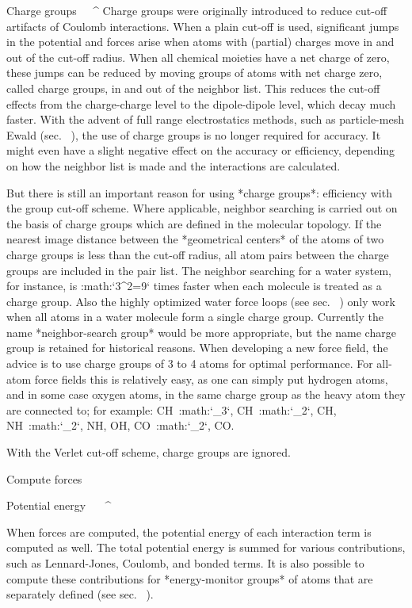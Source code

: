 Charge groups
^^^^^^^^^^^^^
Charge
groups were originally introduced to reduce cut-off artifacts of Coulomb
interactions. When a plain cut-off is used, significant jumps in the
potential and forces arise when atoms with (partial) charges move in and
out of the cut-off radius. When all chemical moieties have a net charge
of zero, these jumps can be reduced by moving groups of atoms with net
charge zero, called charge groups, in and out of the neighbor list. This
reduces the cut-off effects from the charge-charge level to the
dipole-dipole level, which decay much faster. With the advent of full
range electrostatics methods, such as particle-mesh Ewald
(sec. 
), the use of charge groups is no longer
required for accuracy. It might even have a slight negative effect on
the accuracy or efficiency, depending on how the neighbor list is made
and the interactions are calculated.

But there is still an important reason for using *charge groups*:
efficiency with the group cut-off scheme. Where applicable, neighbor
searching is carried out on the basis of charge groups which are defined
in the molecular topology. If the nearest image distance between the
*geometrical centers* of the atoms of two charge groups is less than the
cut-off radius, all atom pairs between the charge groups are included in
the pair list. The neighbor searching for a water system, for instance,
is :math:`3^2=9` times faster when each molecule is treated as a charge
group. Also the highly optimized water force loops (see
sec. 
) only work when all atoms in a
water molecule form a single charge group. Currently the name
*neighbor-search group* would be more appropriate, but the name charge
group is retained for historical reasons. When developing a new force
field, the advice is to use charge groups of 3 to 4 atoms for optimal
performance. For all-atom force fields this is relatively easy, as one
can simply put hydrogen atoms, and in some case oxygen atoms, in the
same charge group as the heavy atom they are connected to; for example:
CH\ :math:`_3`, CH\ :math:`_2`, CH, NH\ :math:`_2`, NH, OH,
CO\ :math:`_2`, CO.

With the Verlet cut-off scheme, charge groups are ignored.

Compute forces
~~~~~~~~~~~~~~

Potential energy
^^^^^^^^^^^^^^^^

When forces are computed, the potential
energy
of each interaction term is computed as well. The total potential energy
is summed for various contributions, such as Lennard-Jones, Coulomb, and
bonded terms. It is also possible to compute these contributions for
*energy-monitor groups* of atoms that are separately defined (see
sec. 
).

